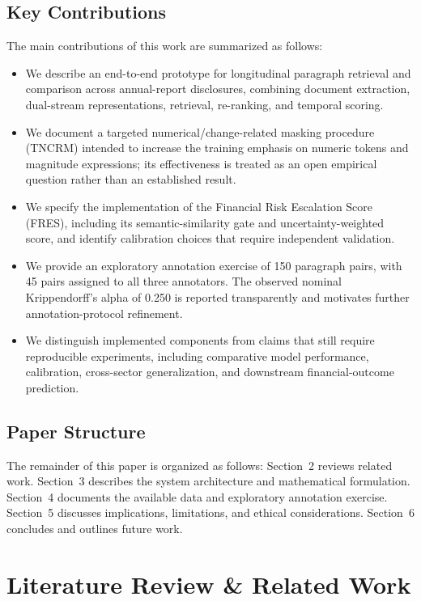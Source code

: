 \documentclass[pdflatex,sn-basic,Numbered]{sn-jnl}
\begin{document}
\subsection{Key Contributions}
The main contributions of this work are summarized as follows:
\begin{itemize}
    \item We describe an end-to-end prototype for longitudinal paragraph retrieval and comparison across annual-report disclosures, combining document extraction, dual-stream representations, retrieval, re-ranking, and temporal scoring.
    \item We document a targeted numerical/change-related masking procedure (TNCRM) intended to increase the training emphasis on numeric tokens and magnitude expressions; its effectiveness is treated as an open empirical question rather than an established result.
    \item We specify the implementation of the Financial Risk Escalation Score (FRES), including its semantic-similarity gate and uncertainty-weighted score, and identify calibration choices that require independent validation.
    \item We provide an exploratory annotation exercise of 150 paragraph pairs, with 45 pairs assigned to all three annotators. The observed nominal Krippendorff's alpha of 0.250 is reported transparently and motivates further annotation-protocol refinement.
    \item We distinguish implemented components from claims that still require reproducible experiments, including comparative model performance, calibration, cross-sector generalization, and downstream financial-outcome prediction.
\end{itemize}

\subsection{Paper Structure}
The remainder of this paper is organized as follows: Section~2 reviews related work. Section~3 describes the system architecture and mathematical formulation. Section~4 documents the available data and exploratory annotation exercise. Section~5 discusses implications, limitations, and ethical considerations. Section~6 concludes and outlines future work.

\section{Literature Review \& Related Work}
\end{document}
